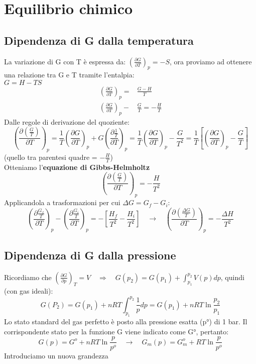 \documentclass{article}
\newcommand{\so}{\quad \rightarrow \quad}
\newcommand{\So}{\quad \Rightarrow \quad}
\newcommand{\dparx}[3]{\left(\frac{\partial #1}{\partial #2}\right)_{#3}}
\begin{document}
\newpage


\section{Equilibrio chimico}
\subsection{Dipendenza di G dalla temperatura}
La variazione di G con T è espressa da: $(\frac{\partial G}{\partial T})_p=-S$, ora proviamo ad ottenere una relazione tra G e T tramite l'entalpia: \\$G=H-TS$
\begin{align*}
    \dparx{G}{T}{p}=&\frac{G-H}{T}\\
    \dparx{G}{T}{p}-&\frac{G}{T}=-\frac{H}{T}
\end{align*}
Dalle regole di derivazione del quoziente:
\begin{equation*}
    \dparx{(\frac{G}{T})}{T}{p}=\frac{1}{T}\dparx{G}{T}{p}+G\dparx{\frac{1}{T}}{T}{p}=\frac{1}{T}\dparx{G}{T}{p}-\frac{G}{T^2}=\frac{1}{T}\left[  \dparx{G}{T}{p}-\frac{G}{T}\right]
\end{equation*}
(quello tra parentesi quadre = $-\frac{H}{T}$)\\
Otteniamo l'\textbf{equazione di Gibbs-Helmholtz}
\begin{equation}
    \dparx{(\frac{G}{T})}{T}{p}=-\frac{H}{T^2}
\end{equation}
Applicandola a trasformazioni per cui $\Delta G=G_f-G_i$:
\begin{equation*}
     \dparx{\frac{G_f}{T}}{T}{p}-\dparx{\frac{G_i}{T}}{T}{p}=-\left[ \frac{H_f}{T^2}-\frac{H_i}{T^2}\right] \so \dparx{(\frac{\Delta G}{T})}{T}{p}=-\frac{\Delta H}{T^2}
\end{equation*}

\subsection{Dipendenza di G dalla pressione}
Ricordiamo che $(\frac{\partial G}{\partial p})_T=V \So G(p_2)=G(p_1)+\int_{p_1}^{p_2}V(p)dp$, quindi (con gas ideali):
\begin{equation*}
    G(P_2)=G(p_1)+nRT\int_{p_1}^{p_2}\frac{1}{p}dp=G(p_1)+nRT\ln{\frac{p_2}{p_1}}
\end{equation*}
Lo stato standard del gas perfetto è posto alla pressione esatta (p°) di 1 bar. Il corrispondente stato per la funzione G viene indicato come G°, pertanto:
\begin{equation*}
    G(p)=G^o+nRT\ln{\frac{p}{p^o}} \so G_m(p)=G_m^o+RT\ln{\frac{p}{p^o}}
\end{equation*}
Introduciamo un nuova grandezza
\end{document}
